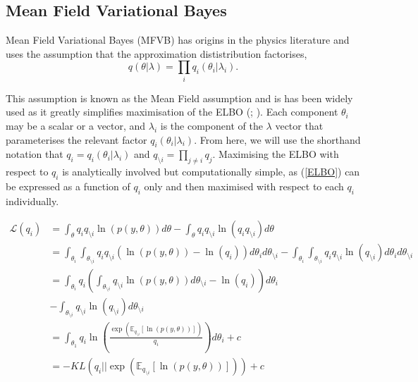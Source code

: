 \documentclass{article}\usepackage[]{graphicx}\usepackage[]{color}
\numberwithin{equation}{section}
\begin{document}
\subsection{Mean Field Variational Bayes}

Mean Field Variational Bayes (MFVB) has origins in the physics literature \citep{Chandler1987} and uses the assumption that the approximation dististribution factorises, 
\begin{equation}
\label{mf1}
q(\theta|\lambda) = \prod_i q_i(\theta_i | \lambda_i).
\end{equation}

This assumption is known as the Mean Field assumption and is has been widely used as it greatly simplifies maximisation of the ELBO (\citealp{Jordan1999}; \citealp{Bishop2006}). Each component $\theta_i$ may be a scalar or a vector, and $\lambda_i$ is the component of the $\lambda$ vector that parameterises the relevant factor $q_i(\theta_i |\lambda_i)$. From here, we will use the shorthand notation that $q_i = q_i(\theta_i|\lambda_i)$ and $q_{\setminus i} = \prod_{j\neq i}q_j$. Maximising the ELBO with respect to $q_i$ is analytically involved but computationally simple, as (\ref{ELBO}) can be expressed as a function of $q_i$ only and then maximised with respect to each $q_i$ individually.

\begin{align}
\mathcal{L}(q_i) &= \int_{\theta} q_i q_{\setminus i} \ln (p(y, \theta)) d\theta - \int_{\theta} q_{i}q_{\setminus i} \ln (q_{i}q_{\setminus i}) d\theta \nonumber \\
&= \int_{\theta_i}\int_{\theta_{\setminus i}} q_{i}q_{\setminus i} ( \ln (p(y, \theta)) - \ln(q_{i})) d\theta_i d\theta_{\setminus i} - \int_{\theta_i}\int_{\theta_{\setminus i}} q_{i}q_{\setminus i} \ln (q_{\setminus i}) d\theta_i d\theta_{\setminus i}  \nonumber \\
&= \int_{\theta_{i}} q_{i} \left( \int_{\theta_{\setminus i}} q_{\setminus i} \ln (p(y, \theta )) d\theta_{\setminus i} - \ln(q_i) \right) d\theta_i \nonumber \\
&- \int_{\theta_{\setminus i}} q_{\setminus i} \ln(q_{\setminus i}) d\theta_{\setminus i} \label{mf2}\\
&= \int_{\theta_{1}} q_{i} \ln \left( \frac{\exp(  \mathbb{E}_{q_{\setminus i}} [\ln(p(y,\theta))])}{q_i} \right) d\theta_i + c \nonumber \\
&= -KL (q_i || \exp( \mathbb{E}_{q_{\setminus i}} [\ln(p(y,\theta))])) + c \label{mf2.2}
\end{align}
\end{document}
